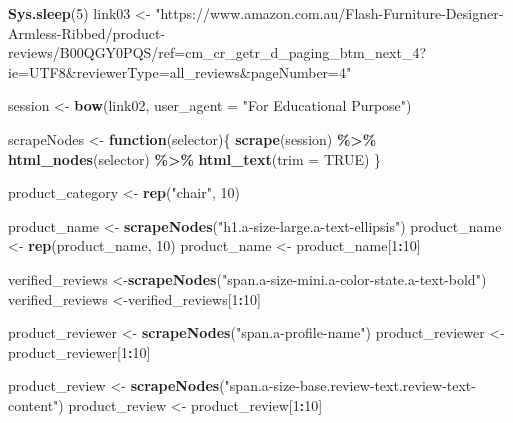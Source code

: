 \documentclass[
]{article}
\newenvironment{Shaded}{\begin{snugshade}}{\end{snugshade}}
\newcommand{\AttributeTok}[1]{\textcolor[rgb]{0.13,0.29,0.53}{#1}}
\newcommand{\ConstantTok}[1]{\textcolor[rgb]{0.56,0.35,0.01}{#1}}
\newcommand{\ControlFlowTok}[1]{\textcolor[rgb]{0.13,0.29,0.53}{\textbf{#1}}}
\newcommand{\DecValTok}[1]{\textcolor[rgb]{0.00,0.00,0.81}{#1}}
\newcommand{\FunctionTok}[1]{\textcolor[rgb]{0.13,0.29,0.53}{\textbf{#1}}}
\newcommand{\NormalTok}[1]{#1}
\newcommand{\OtherTok}[1]{\textcolor[rgb]{0.56,0.35,0.01}{#1}}
\newcommand{\SpecialCharTok}[1]{\textcolor[rgb]{0.81,0.36,0.00}{\textbf{#1}}}
\newcommand{\StringTok}[1]{\textcolor[rgb]{0.31,0.60,0.02}{#1}}
\begin{document}
\begin{Shaded}
\begin{Highlighting}[]
   \FunctionTok{Sys.sleep}\NormalTok{(}\DecValTok{5}\NormalTok{)}
\NormalTok{link03 }\OtherTok{\textless{}{-}} \StringTok{"https://www.amazon.com.au/Flash{-}Furniture{-}Designer{-}Armless{-}Ribbed/product{-}reviews/B00QGY0PQS/ref=cm\_cr\_getr\_d\_paging\_btm\_next\_4?ie=UTF8\&reviewerType=all\_reviews\&pageNumber=4"}


\NormalTok{  session }\OtherTok{\textless{}{-}} \FunctionTok{bow}\NormalTok{(link02,}
               \AttributeTok{user\_agent =} \StringTok{"For Educational Purpose"}\NormalTok{)}

\NormalTok{  scrapeNodes }\OtherTok{\textless{}{-}} \ControlFlowTok{function}\NormalTok{(selector)\{}
    \FunctionTok{scrape}\NormalTok{(session) }\SpecialCharTok{\%\textgreater{}\%}
      \FunctionTok{html\_nodes}\NormalTok{(selector) }\SpecialCharTok{\%\textgreater{}\%}
      \FunctionTok{html\_text}\NormalTok{(}\AttributeTok{trim =} \ConstantTok{TRUE}\NormalTok{)}
\NormalTok{  \}}

\NormalTok{  product\_category }\OtherTok{\textless{}{-}} \FunctionTok{rep}\NormalTok{(}\StringTok{"chair"}\NormalTok{, }\DecValTok{10}\NormalTok{)}

\NormalTok{  product\_name }\OtherTok{\textless{}{-}} \FunctionTok{scrapeNodes}\NormalTok{(}\StringTok{"h1.a{-}size{-}large.a{-}text{-}ellipsis"}\NormalTok{)}
\NormalTok{  product\_name }\OtherTok{\textless{}{-}} \FunctionTok{rep}\NormalTok{(product\_name, }\DecValTok{10}\NormalTok{)}
\NormalTok{  product\_name }\OtherTok{\textless{}{-}}\NormalTok{ product\_name[}\DecValTok{1}\SpecialCharTok{:}\DecValTok{10}\NormalTok{]}
  
\NormalTok{  verified\_reviews }\OtherTok{\textless{}{-}}\FunctionTok{scrapeNodes}\NormalTok{(}\StringTok{"span.a{-}size{-}mini.a{-}color{-}state.a{-}text{-}bold"}\NormalTok{)}
\NormalTok{  verified\_reviews }\OtherTok{\textless{}{-}}\NormalTok{verified\_reviews[}\DecValTok{1}\SpecialCharTok{:}\DecValTok{10}\NormalTok{]}
  
\NormalTok{  product\_reviewer }\OtherTok{\textless{}{-}} \FunctionTok{scrapeNodes}\NormalTok{(}\StringTok{"span.a{-}profile{-}name"}\NormalTok{)}
\NormalTok{  product\_reviewer }\OtherTok{\textless{}{-}}\NormalTok{ product\_reviewer[}\DecValTok{1}\SpecialCharTok{:}\DecValTok{10}\NormalTok{]}
  
\NormalTok{  product\_review }\OtherTok{\textless{}{-}} \FunctionTok{scrapeNodes}\NormalTok{(}\StringTok{"span.a{-}size{-}base.review{-}text.review{-}text{-}content"}\NormalTok{)}
\NormalTok{  product\_review }\OtherTok{\textless{}{-}}\NormalTok{ product\_review[}\DecValTok{1}\SpecialCharTok{:}\DecValTok{10}\NormalTok{]}
  

\end{Highlighting}
\end{Shaded}
\end{document}
